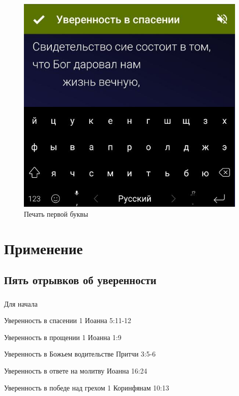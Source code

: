 \documentclass[t,aspectratio=169]{beamer}  %
\begin{document}
\begin{frame}[c]
\begin{multicols}{2}
\begin{center}
\begin{figure}
			\includegraphics[height=0.55\textheight]{remember-me-card-type}
			\caption{Печать первой буквы}
			\end{figure}		
		\end{center}
	 \end{multicols}
\end{frame}

\section{Применение}
\subsection{Пять отрывков об уверенности}
\begin{frame}[c]
	\frametitle{\insertsection}
	\framesubtitle{\insertsubsection}
	Для начала
	\begin{multicols}{2}
	\begin{exampleblock}{Уверенность в спасении}\setlength{\textwidth}{0.4\textwidth}
		1 Иоанна 5:11-12
	\end{exampleblock}
	\begin{exampleblock}{Уверенность в прощении}
		1 Иоанна 1:9
	\end{exampleblock}
	\begin{exampleblock}{Уверенность в Божьем водительстве}
		Притчи 3:5-6
	\end{exampleblock}	
	\begin{exampleblock}{Уверенность в ответе на молитву}
		Иоанна 16:24
	\end{exampleblock}	
	\begin{exampleblock}{Уверенность в победе над грехом}
		1 Коринфянам 10:13
	\end{exampleblock}

	\end{multicols}		
\end{frame}
\end{document}
